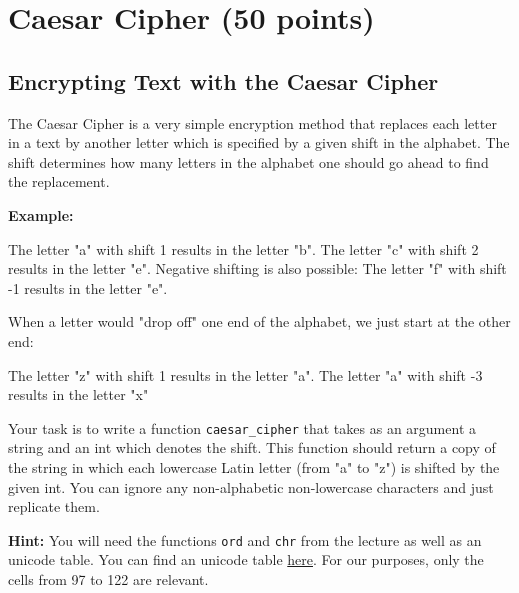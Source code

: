 \section{Caesar Cipher (50 points)}

\subsection{Encrypting Text with the Caesar Cipher}

The Caesar Cipher is a very simple encryption method that replaces each letter in a text by another letter which is specified by a given shift in the alphabet. The shift determines how many letters in the alphabet one should go ahead to find the replacement. 

\vspace{1em}

\noindent \textbf{Example:} 

\vspace{1em}

\noindent The letter "a" with shift 1 results in the letter "b". 
\newline The letter "c" with shift 2 results in the letter "e". 
\newline Negative shifting is also possible: The letter "f" with shift -1 results in the letter "e".

\vspace{1em}

\noindent When a letter would "drop off" one end of the alphabet, we just start at the other end:

\vspace{1em}

\noindent The letter "z" with shift 1 results in the letter "a".
\newline The letter "a" with shift -3 results in the letter "x"

\vspace{1em}

\noindent Your task is to write a function \texttt{caesar\_cipher} that takes as an argument a string and an int which denotes the shift. This function should return a copy of the string in which each lowercase Latin letter (from "a" to "z") is shifted by the given int. You can ignore any non-alphabetic non-lowercase characters and just replicate them.

\vspace{1em}

\noindent \textbf{Hint:} You will need the functions \texttt{ord} and \texttt{chr} from the lecture as well as an unicode table. You can find an unicode table \href{http://www.tamasoft.co.jp/en/general-info/unicode-decimal.html}{here}. For our purposes, only the cells from 97 to 122 are relevant.

